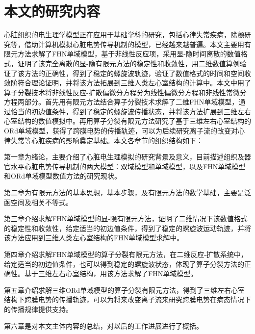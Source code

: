 \documentclass[twoside,UTF8]{nputhesis}
\begin{document}
\section{本文的研究内容}

心脏组织的电生理学模型正在应用于基础学科的研究，包括心律失常疾病，除颤研究等，借助计算机模拟心脏电势传导机制的模型，已经越来越普遍。本文主要用有限元方法求解了FHN单域模型，基于非线性反应项，采用显-隐时间离散的数值格式，证明了该完全离散的显-隐有限元方法的稳定性和收敛性，用二维数值算例验证了该方法的正确性，得到了稳定的螺旋波轨迹，验证了数值格式的时间和空间收敛阶符合理论证明，并将该方法拓展到三维人类左心室结构的计算中。本文中用了算子分裂技术将非线性反应-扩散偏微分方程分为线性偏微分方程和非线性常微分方程两部分。首先用有限元方法结合算子分裂技术求解了二维FHN单域模型，通过恰当的初边值条件，得到了稳定的螺旋波传播状态，并将该方法扩展到三维左右心室结构的数值模拟中。再用算子分裂有限元方法研究了基于三维左右心室结构的ORd单域模型，获得了跨膜电势的传播轨迹，可以为后续研究离子流的改变对心律失常等心脏疾病的影响奠定基础。本文各章节的组织结构如下：

第一章为绪论，主要介绍了心脏电生理模拟的研究背景及意义，目前描述组织及器官水平心脏电势传导机制的两大模型：双域模型和单域模型，以及FHN单域模型和ORd单域模型数值方法的研究现状。

第二章为有限元方法的基本思想，基本步骤，及有限元方法的数学基础，主要是泛函空间及相关不等式。

第三章介绍求解FHN单域模型的显-隐有限元方法，证明了二维情况下该数值格式的稳定性和收敛性，给定适当的初边值条件，得到了稳定的螺旋波运动轨迹，并将该方法应用到三维人类左心室结构的FHN单域模型求解中。

第四章介绍求解FHN单域模型的算子分裂有限元方法，在二维反应-扩散系统中，给定适当的初边值条件，也可以得到稳定的螺旋波状态，体现了算子分裂方法的正确性。基于三维左右心室结构，用该方法求解了FHN单域模型。

第五章介绍求解三维ORd单域模型的算子分裂有限元方法，得到了三维左右心室结构下跨膜电势的传播轨迹，可以为将来改变离子流来研究跨膜电势在病态情况下的传播规律提供支持。

第六章是对本文主体内容的总结，对以后的工作进展进行了概括。
\end{document}
